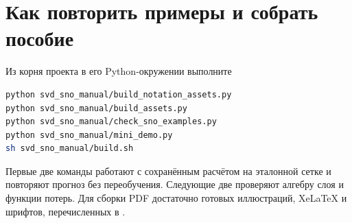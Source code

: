 \section{Как повторить примеры и собрать пособие}
Из корня проекта в его Python-окружении выполните
\begin{lstlisting}[language=bash]
python svd_sno_manual/build_notation_assets.py
python svd_sno_manual/build_assets.py
python svd_sno_manual/check_sno_examples.py
python svd_sno_manual/mini_demo.py
sh svd_sno_manual/build.sh
\end{lstlisting}
Первые две команды работают с сохранённым расчётом на эталонной сетке
и повторяют прогноз без переобучения. Следующие две проверяют алгебру
слоя и функции потерь. Для сборки PDF достаточно готовых иллюстраций,
XeLaTeX и шрифтов, перечисленных в .
